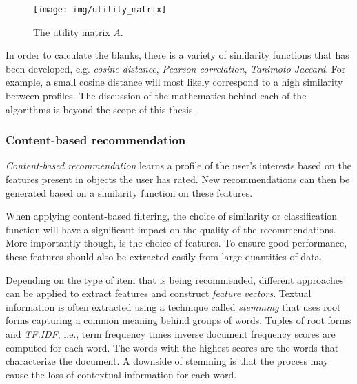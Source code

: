\begin{figure}%
\begin{center}
	\texttt{[image: img/utility\_matrix]}%
\end{center}
	\caption{The utility matrix $A$.}%
	\label{figure:utilitymatrix}%
\end{figure}

In order to calculate the blanks, there is a variety of similarity functions that has been developed, e.g. \emph{cosine distance}, \emph{Pearson correlation}, \emph{Tanimoto-Jaccard}\cite{Verbert:2011:DRI:2090116.2090122}. For example, a small cosine distance will most likely correspond to a high similarity between profiles\cite{rajaraman:2012}. The discussion of the mathematics behind each of the algorithms is beyond the scope of this thesis.


\subsubsection{Content-based recommendation}\label{chapter:literature_study:section:computer:subsection:algorithms:subsubsection:cbf}

\emph{Content-based recommendation} learns a profile of the user's interests based on the features present in objects the user has rated. New recommendations can then be generated based on a similarity function on these features\cite{burke:2002, pazzani:2007:CRS:1768197.1768209}.

When applying content-based filtering, the choice of similarity or classification function will have a significant impact on the quality of the recommendations. More importantly though, is the choice of features. To ensure good performance, these features should also be extracted easily from large quantities of data.

Depending on the type of item that is being recommended, different approaches can be applied to extract features and construct \emph{feature vectors}. Textual information is often extracted using a technique called \emph{stemming} that uses root forms capturing a common meaning behind groups of words. Tuples of root forms and \emph{TF.IDF}, i.e., term frequency times inverse document frequency scores are computed for each word\cite{pazzani:2007:CRS:1768197.1768209, rajaraman:2012}. The words with the highest scores are the words that characterize the document\cite{rajaraman:2012}. A downside of stemming is that the process may cause the loss of contextual information for each word\cite{pazzani:2007:CRS:1768197.1768209}.

